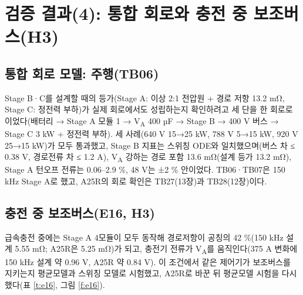 \chapter{검증 결과(4): 통합 회로와 충전 중 보조버스(H3)}

\section{통합 회로 모델: 주행(TB06)}

Stage B·C를 설계할 때의 등가(Stage A: 이상 2:1 전압원 + 경로 저항 13.2 mΩ, Stage C: 정전력 부하)가 실제 회로에서도 성립하는지 확인하려고 세 단을 한 회로로 이었다(배터리 → Stage A 모듈 1 → V\textsubscript{A} 400 µF → Stage B → 400 V 버스 → Stage C 3 kW + 정전력 부하). 세 사례(640 V 15→25 kW, 788 V 5→15 kW, 920 V 25→15 kW)가 모두 통과했고, Stage B 지표는 스위칭 ODE와 일치했으며(버스 차 ≤ 0.38 V, 경로전류 차 ≤ 1.2 A), V\textsubscript{A} 강하는 경로 포함 13.6 mΩ(설계 등가 13.2 mΩ), Stage A 턴오프 전류는 0.06–2.9 \%, 48 V는 ±2 \% 안이었다. TB06·TB07은 150 kHz Stage A로 했고, A25R의 회로 확인은 TB27(13장)과 TB28(12장)이다.


\section{충전 중 보조버스(E16, H3)}

급속충전 중에는 Stage A 4모듈이 모두 동작해 경로저항이 공칭의 42 \%(150 kHz 설계 5.55 mΩ; A25R은 5.25 mΩ)가 되고, 충전기 전류가 V\textsubscript{A}를 움직인다(375 A 변화에 150 kHz 설계 약 0.96 V, A25R 약 0.84 V). 이 조건에서 같은 제어기가 보조버스를 지키는지 평균모델과 스위칭 모델로 시험했고, A25R로 바꾼 뒤 평균모델 시험을 다시 했다(표 \ref{t:e16}, 그림 \ref{f:e16}).

